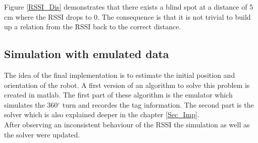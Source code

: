 Figure \ref{RSSI_Dis} demonstrates that there exists a blind spot at a distance of 5 cm where the RSSI drops to 0. The consequence is that it is not trivial to build up a relation from the RSSI back to the correct distance. \\

\subsection{Simulation with emulated data}
The idea of the final implementation is to estimate the initial position and orientation of the robot. A first version of an algorithm to solve this problem is created in matlab. The first part of these algorithm is the emulator which simulates the 360$^\circ$ turn and recordes the tag information. The second part is the solver which is also explained deeper in the chapter \ref{Sec_Imp}. \\
After observing an inconsistent behaviour of the RSSI the simulation as well as the solver were updated.\\

